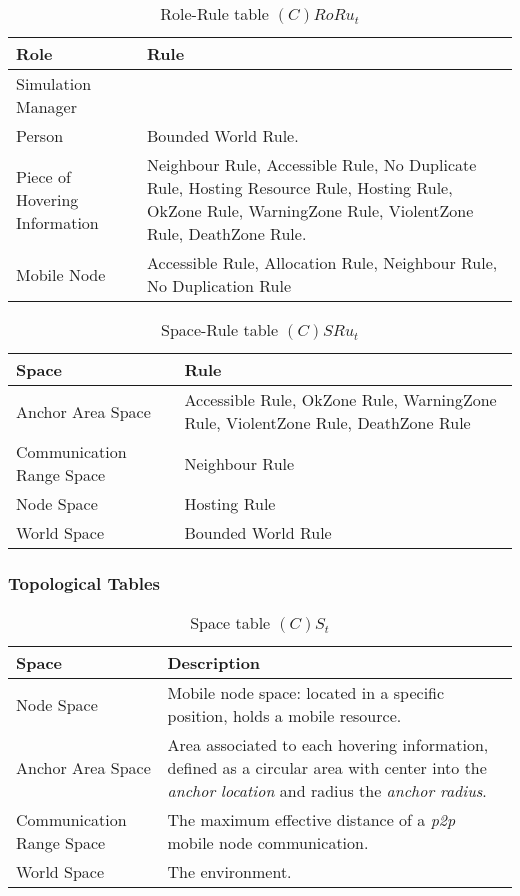\begin{table}[H]
	\centering
	\begin{tabular}{|p{4cm}|p{8cm}|}
			\hline
			\textbf{Role} & \textbf{Rule} \\
			\hline
			Simulation Manager & \\
			\hline
			Person & Bounded World Rule. \\
			\hline
      Piece of Hovering Information &  Neighbour Rule, Accessible Rule, No
      Duplicate Rule, Hosting Resource Rule, Hosting Rule, OkZone Rule,
      WarningZone Rule, ViolentZone Rule, DeathZone Rule.  \\
			\hline
      Mobile Node & Accessible Rule, Allocation Rule, Neighbour Rule, No Duplication Rule \\
			\hline
		\end{tabular}
	\caption{Role-Rule table $(C)RoRu_t$}
	\label{tab:crorut}
\end{table}

\begin{table}[H]
	\centering
	\begin{tabular}{|p{4cm}|p{8cm}|}
			\hline
			\textbf{Space} & \textbf{Rule} \\
			\hline
			Anchor Area Space & Accessible Rule, OkZone Rule, WarningZone Rule, ViolentZone Rule, DeathZone Rule \\
			\hline
			Communication Range Space & Neighbour Rule \\
			\hline
			Node Space & Hosting Rule \\
			\hline
			World Space & Bounded World Rule \\
			\hline
		\end{tabular}
	\caption{Space-Rule table $(C)SRu_t$}
	\label{tab:cot}
\end{table}

\subsubsection{Topological Tables}

\begin{table}[H]
	\centering
	\begin{tabular}{|p{4cm}|p{8cm}|}
			\hline
			\textbf{Space} & \textbf{Description} \\
			\hline
			Node Space & Mobile node space: located in a specific position, holds a
			mobile resource. \\
			\hline
			Anchor Area Space & Area associated to each hovering information, defined as a
			circular area with center into the \emph{anchor location} and radius the
			\emph{anchor radius}.\\
			\hline
			Communication Range Space & The maximum effective distance of a \emph{p2p}
			mobile node communication. \\
			\hline
			World Space & The environment. \\
			\hline
		\end{tabular}
	\caption{Space table $(C)S_t$}
	\label{tab:st}
\end{table}

